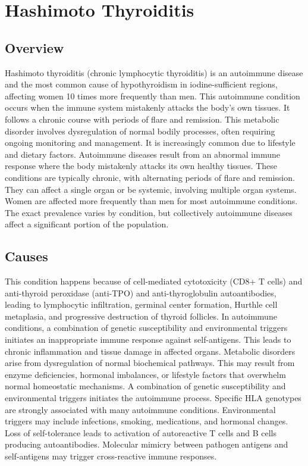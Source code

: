 \chapter{Hashimoto Thyroiditis}
\label{sec:Hashimoto Thyroiditis}

\section{Overview}
Hashimoto thyroiditis (chronic lymphocytic thyroiditis) is an autoimmune disease and the most common cause of hypothyroidism in iodine-sufficient regions, affecting women 10 times more frequently than men. This autoimmune condition occurs when the immune system mistakenly attacks the body's own tissues. It follows a chronic course with periods of flare and remission. This metabolic disorder involves dysregulation of normal bodily processes, often requiring ongoing monitoring and management. It is increasingly common due to lifestyle and dietary factors. Autoimmune diseases result from an abnormal immune response where the body mistakenly attacks its own healthy tissues. These conditions are typically chronic, with alternating periods of flare and remission. They can affect a single organ or be systemic, involving multiple organ systems. Women are affected more frequently than men for most autoimmune conditions. The exact prevalence varies by condition, but collectively autoimmune diseases affect a significant portion of the population.
\section{Causes}
This condition happens because of cell-mediated cytotoxicity (CD8+ T cells) and anti-thyroid peroxidase (anti-TPO) and anti-thyroglobulin autoantibodies, leading to lymphocytic infiltration, germinal center formation, Hurthle cell metaplasia, and progressive destruction of thyroid follicles. In autoimmune conditions, a combination of genetic susceptibility and environmental triggers initiates an inappropriate immune response against self-antigens. This leads to chronic inflammation and tissue damage in affected organs. Metabolic disorders arise from dysregulation of normal biochemical pathways. This may result from enzyme deficiencies, hormonal imbalances, or lifestyle factors that overwhelm normal homeostatic mechanisms. A combination of genetic susceptibility and environmental triggers initiates the autoimmune process. Specific HLA genotypes are strongly associated with many autoimmune conditions. Environmental triggers may include infections, smoking, medications, and hormonal changes. Loss of self-tolerance leads to activation of autoreactive T cells and B cells producing autoantibodies. Molecular mimicry between pathogen antigens and self-antigens may trigger cross-reactive immune responses.
